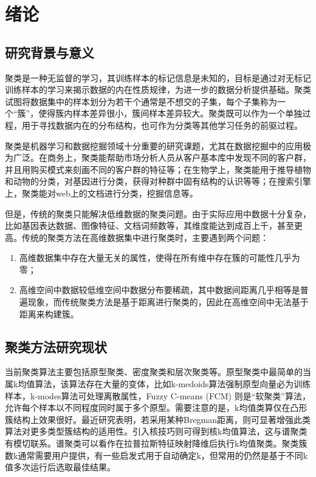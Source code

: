 \chapter{绪论}

\section{研究背景与意义}

聚类是一种无监督的学习，其训练样本的标记信息是未知的，目标是通过对无标记训练样本的学习来揭示数据的内在性质规律，为进一步的数据分析提供基础。聚类试图将数据集中的样本划分为若干个通常是不想交的子集，每个子集称为一个“簇”，使得簇内样本差异很小，簇间样本差异较大。聚类既可以作为一个单独过程，用于寻找数据内在的分布结构，也可作为分类等其他学习任务的前驱过程。

聚类是机器学习和数据挖掘领域十分重要的研究课题，尤其在数据挖掘中的应用极为广泛。在商务上，聚类能帮助市场分析人员从客户基本库中发现不同的客户群，并且用购买模式来刻画不同的客户群的特征等；在生物学上，聚类能用于推导植物和动物的分类，对基因进行分类，获得对种群中固有结构的认识等等；在搜索引擎上，聚类能对web上的文档进行分类，挖掘信息等。

但是，传统的聚类只能解决低维数据的聚类问题。由于实际应用中数据十分复杂，比如基因表达数据、图像特征、文档词频数等，其维度能达到成百上千，甚至更高。传统的聚类方法在高维数据集中进行聚类时，主要遇到两个问题：
  \begin{enumerate}[fullwidth,itemindent=24pt]
  \item 高维数据集中存在大量无关的属性，使得在所有维中存在簇的可能性几乎为零；
  \item 高维空间中数据较低维空间中数据分布要稀疏，其中数据间距离几乎相等是普遍现象，而传统聚类方法是基于距离进行聚类的，因此在高维空间中无法基于距离来构建簇。
  \end{enumerate}

\section{聚类方法研究现状}
当前聚类算法主要包括原型聚类、密度聚类和层次聚类等。原型聚类中最简单的当属k均值算法，该算法存在大量的变体，比如k-medoids算法强制原型向量必为训练样本，k-modes算法可处理离散属性，Fuzzy C-means (FCM) 则是“软聚类”算法，允许每个样本以不同程度同时属于多个原型。需要注意的是，k均值类算仅在凸形簇结构上效果很好。最近研究表明，若采用某种Bregman距离，则可显著增强此类算法对更多类型簇结构的适用性。引入核技巧则可得到核k均值算法，这与谱聚类有模切联系。谱聚类可以看作在拉普拉斯特征映射降维后执行k均值聚类。聚类簇数k通常需要用户提供，有一些启发式用于自动确定k，但常用的仍然是基于不同k值多次运行后选取最佳结果。

